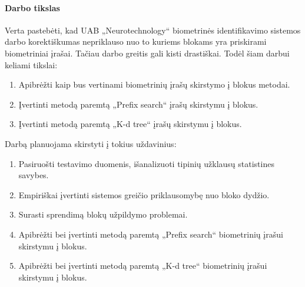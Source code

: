 \paragraph{Darbo tikslas}

Verta pastebėti, kad UAB „Neurotechnology“ biometrinės identifikavimo sistemos darbo korektiškumas nepriklauso nuo to kuriems blokams yra priskirami biometriniai įrašai.
Tačiau darbo greitis gali kisti drastiškai.
Todėl šiam darbui keliami tikslai:
\begin{enumerate}
	\item Apibrėžti kaip bus vertinami biometrinių įrašų skirstymo į blokus metodai.
	\item Įvertinti metodą paremtą „Prefix search“ įrašų skirstymu į blokus.
	\item Įvertinti metodą paremtą „K-d tree“ įrašų skirstymu į blokus.
\end{enumerate}

Darbą planuojama skirstyti į tokius uždavinius:

\begin{enumerate}
	\item Pasiruošti testavimo duomenis, išanalizuoti tipinių užklausų statistines savybes.
	\item Empiriškai įvertinti sistemos greičio priklausomybę nuo bloko dydžio.
	\item Surasti sprendimą blokų užpildymo problemai.
	\item Apibrėžti bei įvertinti metodą paremtą „Prefix search“ biometrinių įrašui skirstymu į blokus.
	\item Apibrėžti bei įvertinti metodą paremtą „K-d tree“ biometrinių įrašui skirstymu į blokus.
\end{enumerate}


